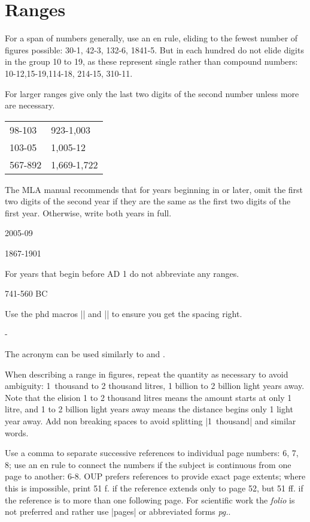 \section{Ranges}

For a span of numbers generally, use an en rule, eliding to the fewest
number of figures possible: 30-1, 42-3, 132-6, 1841-5. But in each hundred
do not elide digits in the group 10 to 19, as these represent single
rather than compound numbers: 10-12,15-19,114-18, 214-15, 310-11.

For larger ranges give only the last two digits of the second number unless more are necessary.

\begin{longtable}{ll}
98-103    &923-1,003\\
103-05    &1,005-12\\
567-892   &1,669-1,722\\
\end{longtable}

The MLA manual \citep{MLA} recommends that for years beginning in  or later, omit the first two digits of the second year if they are the same as the first two digits of the first year. Otherwise, write both years in full.

2005-09

1867-1901

For years that begin before AD 1 do not abbreviate any ranges.

741-560 BC

Use the phd macros |\BC| and |\AD| to ensure you get the spacing right.


-

The acronym \bce{} can be used similarly to \BC{} and \AD{}. 


When describing a range in figures, repeat the quantity as necessary to
avoid ambiguity: 1~thousand to 2 thousand litres, 1 billion to 2 billion light years
away. Note that the elision 1 to 2 thousand litres means the amount starts at only
1 litre, and 1 to 2 billion light years away means the distance begins only
1 light year away. Add non breaking spaces to avoid splitting |1~thousand| and similar words.


Use a comma to separate successive references to individual page
numbers: 6, 7, 8; use an en rule to connect the numbers if the subject
is continuous from one page to another: 6-8. OUP prefers references to
provide exact page extents; where this is impossible, print 51 f. if the
reference extends only to page 52, but 51 ff. if the reference is to more than one following page. For scientific work the \textit{folio} is not preferred and rather use |pages| or abbreviated forms \textit{pg.}. 


